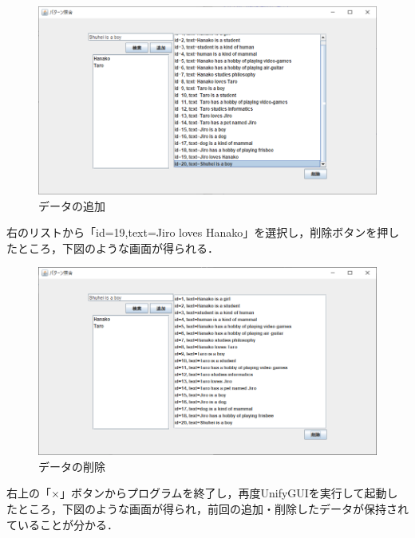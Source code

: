 \documentclass[12pt]{jarticle}
\begin{document}
\begin{figure}[!hbt]
  	\begin{center}
  		\includegraphics[scale=0.60]{images/scs2-3-3.png}
	\end{center}
  	\caption{データの追加}
\end{figure}
\clearpage

右のリストから「id=19,text=Jiro loves Hanako」を選択し，削除ボタンを押したところ，下図のような画面が得られる．

\begin{figure}[!hbt]
  	\begin{center}
  		\includegraphics[scale=0.60]{images/scs2-3-4.png}
	\end{center}
  	\caption{データの削除}
\end{figure}
\clearpage

右上の「×」ボタンからプログラムを終了し，再度UnifyGUIを実行して起動したところ，下図のような画面が得られ，前回の追加・削除したデータが保持されていることが分かる．
\end{document}
